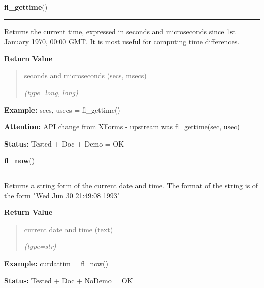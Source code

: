 \hspace{.8\funcindent}\begin{boxedminipage}{\funcwidth}

    \raggedright \textbf{fl\_gettime}()

    \vspace{-1.5ex}

    \rule{\textwidth}{0.5\fboxrule}
\setlength{\parskip}{2ex}
    Returns the current time, expressed in seconds and microseconds since 
    1st January 1970, 00:00 GMT. It is most useful for computing time 
    differences.

\setlength{\parskip}{1ex}
      \textbf{Return Value}
    \vspace{-1ex}

      \begin{quote}
      seconds and microseconds (secs, msecs)

      {\it (type=long, long)}

      \end{quote}

\textbf{Example:} secs, usecs = fl\_gettime()



\textbf{Attention:} API change from XForms - upstream was fl\_gettime(sec, usec)



\textbf{Status:} Tested + Doc + Demo = OK



    \end{boxedminipage}

    \label{xformslib:flbasic:fl_now}

    \vspace{0.5ex}

\hspace{.8\funcindent}\begin{boxedminipage}{\funcwidth}

    \raggedright \textbf{fl\_now}()

    \vspace{-1.5ex}

    \rule{\textwidth}{0.5\fboxrule}
\setlength{\parskip}{2ex}
    Returns a string form of the current date and time. The format of the 
    string is of the form "Wed Jun 30 21:49:08 1993"

\setlength{\parskip}{1ex}
      \textbf{Return Value}
    \vspace{-1ex}

      \begin{quote}
      current date and time (text)

      {\it (type=str)}

      \end{quote}

\textbf{Example:} curdattim = fl\_now()



\textbf{Status:} Tested + Doc + NoDemo = OK



    \end{boxedminipage}

